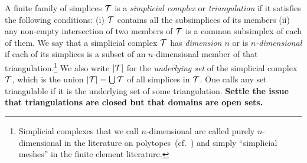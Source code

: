 \documentclass[10pt,a4paper]{article}
\newcommand{\todo}[1]{{\color{RedOrange}\textbf{#1}}}
\begin{document}
A finite family of simplices ${\mathcal T}$ is a \emph{simplicial complex} or \emph{triangulation} if it satisfies the following conditions: 
(i) ${\mathcal T}$ contains all the subsimplices of its members (ii) any non-empty intersection of two members of ${\mathcal T}$ is a common subsimplex of each of them. 
We say that a simplicial complex ${\mathcal T}$ has \emph{dimension $n$} or is \emph{$n$-dimensional} if each of its simplices is a subset of an $n$-dimensional member of that triangulation.\footnote{Simplicial complexes that we call $n$-dimensional are called purely $n$-dimensional in the literature on polytopes~(cf.\ \cite{ziegler1995lectures}) and simply ``simplicial meshes'' in the finite element literature.} 
We also write $\left| {\mathcal T} \right|$ for the \emph{underlying set} of the simplicial complex ${\mathcal T}$, 
which is the union $\left| {\mathcal T} \right| = \bigcup {\mathcal T}$ of all simplices in ${\mathcal T}$.
One calls any set triangulable if it is the underlying set of some triangulation. 
\todo{Settle the issue that triangulations are closed but that domains are open sets.}


\begin{comment}
\begin{remark}
    Our main interest in this manuscript are finite triangulations of compact sets. 
    There is another reason why we insist on the triangulation being finite: 
    if we do not require our simplicial complexes to be finite,
    then a reasonable definition of simplicial complex would need additional topological conditions. 
    For example, if we modify our definition of simplicial complex to be infinite, 
    then any subset of Euclidean space would give rise to an ``infinite $0$-dimensional complex''. But this obviously does not reflect the topology. 
    A more interesting such example is this:
    the Cantor set $\calC \subseteq [0,1]$ is a compact set 
    that underlies an ``infinite $0$-dimensional simplicial complex''.
    If we place $\calC$ on the x-axis of a 2D coordinate system 
    and connect each member of $\calC$ to $(0,1) \in \bbR^{2}$ via a straight line segment, 
    then the resulting set is still compact, even path-connected,  
    but has an ``infinite $1$-dimensional triangulation''.
    However, none of these infinite families are infinite simplicial complexes in the sense of geometric topology~\cite{lee2011topological}. 
\end{remark}
\end{comment}
\end{document}
